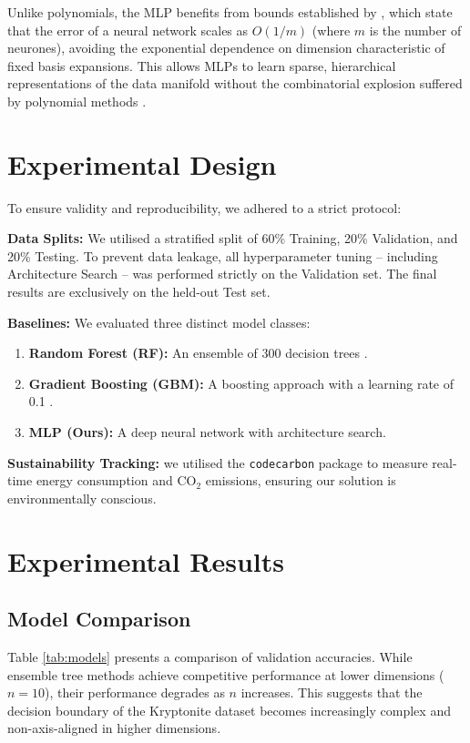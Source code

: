 \documentclass{article}
\newcommand{\csection}[1]{\section{\textcolor{imperialblue}{#1}}}
\begin{document}
Unlike polynomials, the MLP benefits from bounds established by \citep{barron1993}, which state that the error of a neural network scales as $O(1/m)$ (where $m$ is the number of neurones), avoiding the exponential dependence on dimension characteristic of fixed basis expansions. This allows MLPs to learn sparse, hierarchical representations of the data manifold without the combinatorial explosion suffered by polynomial methods \citep{goodfellow2016}.


\csection{Experimental Design}
\label{Experimental Design}

To ensure validity and reproducibility, we adhered to a strict protocol:

\textbf{Data Splits:} We utilised a stratified split of 60\% Training, 20\% Validation, and 20\% Testing. To prevent data leakage, all hyperparameter tuning -- including Architecture Search -- was performed strictly on the Validation set. The final results are exclusively on the held-out Test set.

\textbf{Baselines:} We evaluated three distinct model classes:
\begin{enumerate}
    \item \textbf{Random Forest (RF):} An ensemble of 300 decision trees \citep{breiman2001}.
    \item \textbf{Gradient Boosting (GBM):} A boosting approach with a learning rate of 0.1 \citep{friedman2001}.
    \item \textbf{MLP (Ours):} A deep neural network with architecture search. 
\end{enumerate}

\textbf{Sustainability Tracking:} we utilised the \texttt{codecarbon} package to measure real-time energy consumption and CO$_2$ emissions, ensuring our solution is environmentally conscious.

\csection{Experimental Results}
\label{Experimental Results}

\subsection{Model Comparison}
Table \ref{tab:models} presents a comparison of validation accuracies. While ensemble tree methods achieve competitive performance at lower dimensions ($n=10$), their performance degrades as $n$ increases. This suggests that the decision boundary of the Kryptonite dataset becomes increasingly complex and non-axis-aligned in higher dimensions.
\end{document}
